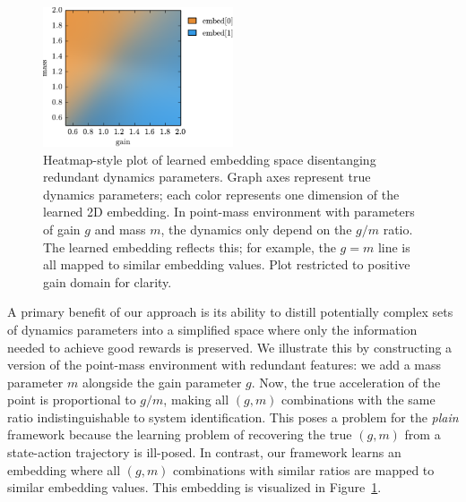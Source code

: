 \documentclass{article}
\newcommand{\TODO}[1]{\textcolor{red}{\textbf{TODO: #1}}}
\newcommand{\sysid}{dynamics}
\newcommand{\plain}{\emph{plain}}
\begin{document}
\begin{figure}
\centering
\includegraphics[width=0.5\textwidth]{embed_colors.pdf}
\caption{
Heatmap-style plot of learned embedding space disentanging redundant \sysid{} parameters.
Graph axes represent true dynamics parameters; each color represents one dimension of the learned 2D embedding.
In point-mass environment with parameters of gain $g$ and mass $m$,
the dynamics only depend on the $g/m$ ratio.
The learned embedding reflects this; for example, the $g=m$ line is all mapped to similar embedding values.
Plot restricted to positive gain domain for clarity.
}
\label{fig:embed_colors}
\end{figure}
A primary benefit of our approach is its ability to distill potentially complex sets of dynamics parameters
into a simplified space where only the information needed to achieve good rewards is preserved.
We illustrate this by constructing a version of the point-mass environment with redundant features:
we add a mass parameter $m$ alongside the gain parameter $g$.
Now, the true acceleration of the point is proportional to $g/m$,
making all $(g, m)$ combinations with the same ratio indistinguishable to system identification.
This poses a problem for the \plain{} 
framework
because the learning problem of recovering the true $(g, m)$ from a state-action trajectory is ill-posed.
In contrast, our framework learns an embedding where all $(g, m)$ combinations with similar ratios are mapped to similar embedding values.
This embedding is visualized in Figure~\ref{fig:embed_colors}.

\end{document}
